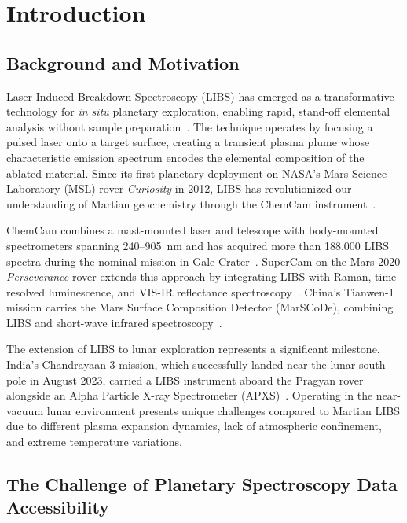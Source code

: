 \documentclass[11pt,a4paper]{article}
\begin{document}
\vspace{2mm}


\section{Introduction}

\subsection{Background and Motivation}

Laser-Induced Breakdown Spectroscopy (LIBS) has emerged as a transformative technology for \textit{in situ} planetary exploration, enabling rapid, stand-off elemental analysis without sample preparation~\cite{Cremers2006}. The technique operates by focusing a pulsed laser onto a target surface, creating a transient plasma plume whose characteristic emission spectrum encodes the elemental composition of the ablated material. Since its first planetary deployment on NASA's Mars Science Laboratory (MSL) rover \textit{Curiosity} in 2012, LIBS has revolutionized our understanding of Martian geochemistry through the ChemCam instrument~\cite{Wiens2012,Maurice2012}.

ChemCam combines a mast-mounted laser and telescope with body-mounted spectrometers spanning 240--905~nm and has acquired more than 188,000 LIBS spectra during the nominal mission in Gale Crater~\cite{Mangold2016}. SuperCam on the Mars 2020 \textit{Perseverance} rover extends this approach by integrating LIBS with Raman, time-resolved luminescence, and VIS-IR reflectance spectroscopy~\cite{Wiens2020}. China's Tianwen-1 mission carries the Mars Surface Composition Detector (MarSCoDe), combining LIBS and short-wave infrared spectroscopy~\cite{Xu2021}.

The extension of LIBS to lunar exploration represents a significant milestone. India's Chandrayaan-3 mission, which successfully landed near the lunar south pole in August 2023, carried a LIBS instrument aboard the Pragyan rover alongside an Alpha Particle X-ray Spectrometer (APXS)~\cite{ISROCh3}. Operating in the near-vacuum lunar environment presents unique challenges compared to Martian LIBS due to different plasma expansion dynamics, lack of atmospheric confinement, and extreme temperature variations.

\subsection{The Challenge of Planetary Spectroscopy Data Accessibility}
\end{document}
